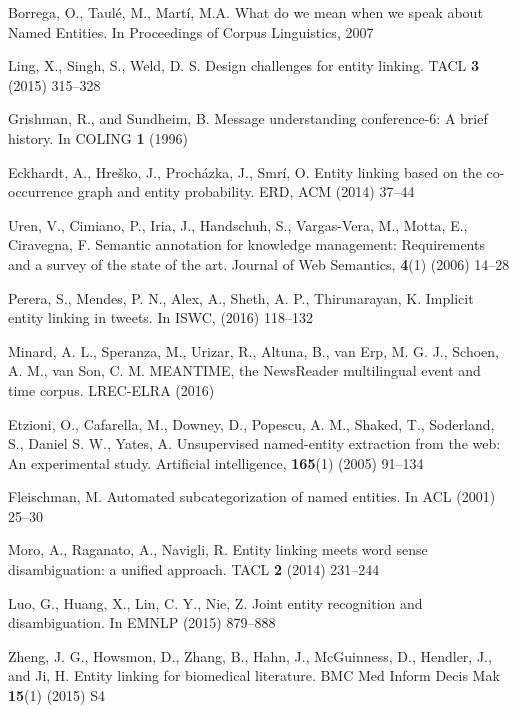 \documentclass{llncs}
\begin{document}

\begin{thebibliography}{99}

Borrega, O., Taul\'e, M., Mart\'i, M.A. What do we mean when we speak about Named Entities. In Proceedings of Corpus Linguistics, 2007

Ling, X., Singh, S., Weld, D. S. Design challenges for entity linking. TACL \textbf{3} (2015) 315--328

Grishman, R., and Sundheim, B. Message understanding conference-6: A brief history. In COLING \textbf{1} (1996)

Eckhardt, A., Hre\v{s}ko, J., Proch\'azka, J., Smr\'i, O. Entity linking based on the co-occurrence graph and entity probability. ERD, ACM (2014) 37--44

Uren, V., Cimiano, P., Iria, J., Handschuh, S., Vargas-Vera, M., Motta, E., Ciravegna, F. Semantic annotation for knowledge management: Requirements and a survey of the state of the art. Journal of Web Semantics, \textbf{4}(1) (2006) 14--28

Perera, S., Mendes, P. N., Alex, A., Sheth, A. P., Thirunarayan, K. Implicit entity linking in tweets. In ISWC, (2016) 118--132

Minard, A. L., Speranza, M., Urizar, R., Altuna, B., van Erp, M. G. J., Schoen, A. M., van Son, C. M. MEANTIME, the NewsReader multilingual event and time corpus. LREC-ELRA (2016)

Etzioni, O., Cafarella, M., Downey, D., Popescu, A. M., Shaked, T., Soderland, S., Daniel S. W., Yates, A. Unsupervised named-entity extraction from the web: An experimental study. Artificial intelligence, \textbf{165}(1) (2005) 91--134

Fleischman, M. Automated subcategorization of named entities. In ACL (2001) 25--30

Moro, A., Raganato, A.,  Navigli, R. Entity linking meets word sense disambiguation: a unified approach. TACL \textbf{2} (2014) 231--244

Luo, G., Huang, X., Lin, C. Y., Nie, Z. Joint entity recognition and disambiguation. In EMNLP (2015) 879--888


Zheng, J. G., Howsmon, D., Zhang, B., Hahn, J., McGuinness, D., Hendler, J., and Ji, H. Entity linking for biomedical literature. BMC Med Inform Decis Mak \textbf{15}(1) (2015) S4


\end{thebibliography}
\end{document}
